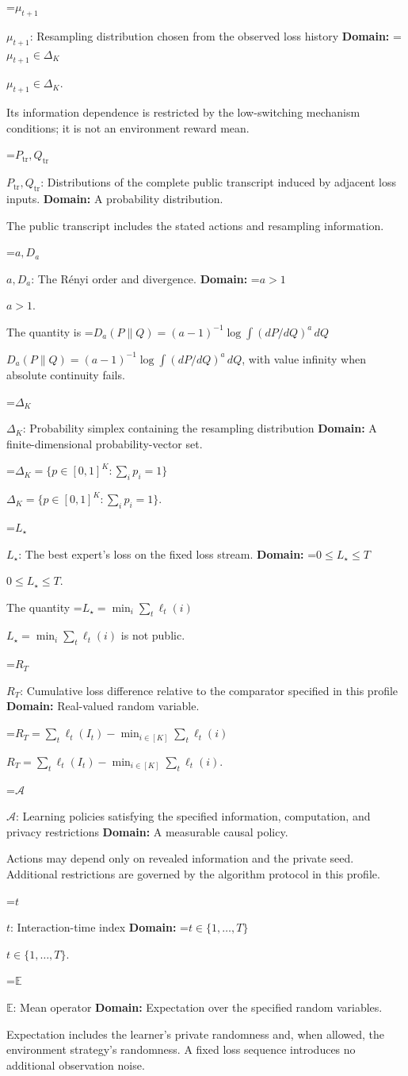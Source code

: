 \documentclass[10pt,a4paper]{article}
\newcommand{\AtlasMath}[1]{\par\begingroup\centering\setbox0=\hbox{$\displaystyle #1$}\ifdim\wd0>1.4\linewidth\typeout{ATLAS WIDE FORMULA: \the\wd0}\fi\ifdim\wd0>\linewidth\resizebox{\linewidth}{!}{\box0}\else\box0\fi\par\endgroup}
\newcommand{\AtlasInlineMath}[1]{\begingroup\setbox0=\hbox{$#1$}\ifdim\wd0>.4\linewidth\endgroup\AtlasMath{#1}\else\endgroup$#1$\fi}
\begin{document}
\AtlasInlineMath{\mu_{t+1}}: Resampling distribution chosen from the observed loss history \textbf{Domain:} \AtlasInlineMath{\mu_{t+1}\in\Delta_K}.

Its information dependence is restricted by the low-switching mechanism conditions; it is not an environment reward mean.

\AtlasInlineMath{P_{\mathrm{tr}},Q_{\mathrm{tr}}}: Distributions of the complete public transcript induced by adjacent loss inputs. \textbf{Domain:} A probability distribution.

The public transcript includes the stated actions and resampling information.

\AtlasInlineMath{a,D_a}: The Rényi order and divergence. \textbf{Domain:} \AtlasInlineMath{a>1}.

The quantity is \AtlasInlineMath{D_a(P\|Q)=(a-1)^{-1}\log\int(dP/dQ)^a\,dQ}, with value infinity when absolute continuity fails.

\AtlasInlineMath{\Delta_K}: Probability simplex containing the resampling distribution \textbf{Domain:} A finite-dimensional probability-vector set.

\AtlasInlineMath{\Delta_K=\{p\in[0,1]^K:\sum_ip_i=1\}}.

\AtlasInlineMath{L_\star}: The best expert’s loss on the fixed loss stream. \textbf{Domain:} \AtlasInlineMath{0\le L_\star\le T}.

The quantity \AtlasInlineMath{L_\star=\min_i\sum_t\ell_t(i)} is not public.

\AtlasInlineMath{R_T}: Cumulative loss difference relative to the comparator specified in this profile \textbf{Domain:} Real-valued random variable.

\AtlasInlineMath{R_T=\sum_t\ell_t(I_t)-\min_{i\in[K]}\sum_t\ell_t(i)}.

\AtlasInlineMath{\mathcal A}: Learning policies satisfying the specified information, computation, and privacy restrictions \textbf{Domain:} A measurable causal policy.

Actions may depend only on revealed information and the private seed. Additional restrictions are governed by the algorithm protocol in this profile.

\AtlasInlineMath{t}: Interaction-time index \textbf{Domain:} \AtlasInlineMath{t\in\{1,\ldots,T\}}.

\AtlasInlineMath{\mathbb E}: Mean operator \textbf{Domain:} Expectation over the specified random variables.

Expectation includes the learner's private randomness and, when allowed, the environment strategy's randomness. A fixed loss sequence introduces no additional observation noise.
\end{document}
